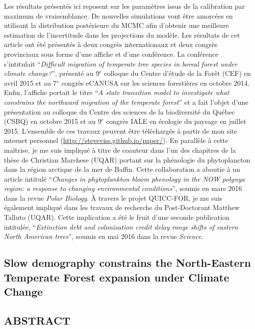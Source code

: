 Les résultats présentés ici reposent sur les paramètres issus de la calibration par maximum de
vraisemblance. De nouvelles simulations vont être amorcées en utilisant la distribution postérieure
du MCMC afin d'obtenir une meilleure estimation de l'incertitude dans les projections du modèle. Les
résultats de cet article ont été présentés à deux congrès internationaux et deux congrès provinciaux
sous forme d'une affiche et d'une conférence. La conférence s'intitulait \enquote{\textit{Difficult
migration of temperate tree species in boreal forest under climate change?}}, présenté au 9$^e$
colloque du Centre d'étude de la Forêt (CEF) en avril 2015 et au 7$^e$ congrès eCANUSA sur les
sciences forestières en octobre 2014. Enfin, l'affiche portait le titre \enquote{\textit{A state
transition model to investigate what constrains the northward migration of the temperate forest}} et
a fait l'objet d'une présentation au colloque du Centre des sciences de la biodiversité du Québec
(CSBQ) en octobre 2015 et au 9$^e$ congrès IALE en écologie du paysage en juillet 2015. L'ensemble
de ces travaux peuvent être téléchargés à partir de mon site internet personnel
(\url{http://steveviss.github.io/paper/}). En parallèle à cette maîtrise, je me suis impliqué à
titre de coauteur dans l'un des chapitres de la thèse de Christian Marchese (UQAR) portant sur la
phénologie du phytoplancton dans la région arctique de la mer de Baffin. Cette collaboration a
aboutie à un article intitulé \enquote{\textit{Changes in phytoplankton bloom phenology in the NOW
polynya region: a response to changing environmental conditions}}, soumis en mars 2016 dans la revue
\textit{Polar Biology}. À travers le projet QUICC-FOR, je me suis également impliqué dans les
travaux de recherche du Post-Doctorant Matthew Talluto (UQAR). Cette implication a été le fruit
d'une seconde publication intitulée, \enquote{\textit{Extinction debt and colonization credit delay
range shifts of eastern North American trees}}, soumis en mai 2016 dans la revue \textit{Science}.


\newpage

\begin{spacing}{1.0}
\section{Slow demography constrains the North-Eastern Temperate Forest expansion under Climate Change}
\end{spacing}

\subsection*{\uppercase{Abstract}}


